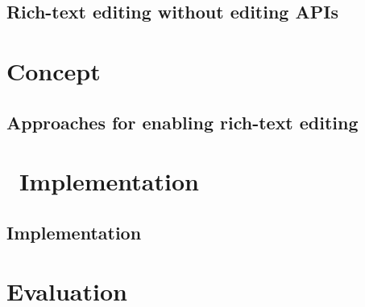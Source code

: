 \chapter{Rich-text editing without editing APIs}








\part{Concept}
\label{part-concept}

\chapter{Approaches for enabling rich-text editing}
\label{ch:approaches}



\part{\ Implementation}
\label{part:implementation}

\chapter{Implementation}
\label{ch:impl}



\part{Evaluation}
\label{part:evaluation}

